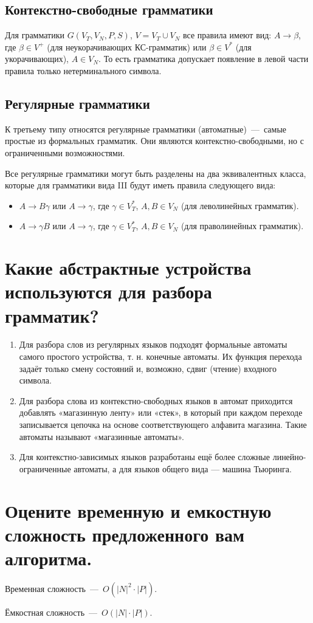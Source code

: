 \subsection{Контекстно-свободные грамматики}
Для грамматики $G(V_{T},V_{N},P,S)$, $V=V_{T}\cup V_{N}$ все правила имеют вид: $A\rightarrow \beta$, где $\beta \in V^{+}$ (для неукорачивающих КС-грамматик) или $\beta \in V^{*}$ (для укорачивающих), 
$A\in V_{N}$. То есть грамматика допускает появление в левой части правила только нетерминального символа.

\subsection{Регулярные грамматики}
К третьему типу относятся регулярные грамматики (автоматные)~---~самые простые из формальных грамматик. Они являются контекстно-свободными, но с ограниченными возможностями.

Все регулярные грамматики могут быть разделены на два эквивалентных класса, которые для грамматики вида III будут иметь правила следующего вида:
\begin{itemize}
 \item $A\rightarrow B\gamma$ или $A\rightarrow \gamma$, где $\gamma \in V_{T}^{*}$, $A,B\in V_{N}$ (для леволинейных грамматик).
 \item $A\rightarrow \gamma B$ или $A\rightarrow \gamma$, где $\gamma \in V_{T}^{*}$, $A,B\in V_{N}$ (для праволинейных грамматик).
\end{itemize}

\section{Какие абстрактные устройства используются для разбора грамматик?}
\begin{enumerate}
 \item Для разбора слов из регулярных языков подходят формальные автоматы самого простого устройства, т. н. конечные автоматы. Их функция перехода задаёт только смену состояний и, возможно, сдвиг (чтение) входного символа.
 \item Для разбора слова из контекстно-свободных языков в автомат приходится добавлять «магазинную ленту» или «стек», в который при каждом переходе записывается цепочка на основе соответствующего алфавита магазина. Такие автоматы называют «магазинные автоматы».
 \item Для контекстно-зависимых языков разработаны ещё более сложные линейно-ограниченные автоматы, а для языков общего вида — машина Тьюринга.
\end{enumerate}

\section{Оцените временную и емкостную сложность предложенного вам алгоритма.}

Временная сложность~---~$O(|N|^2 \cdot |P|)$.

Ёмкостная сложность~---~$O(|N| \cdot |P|)$.